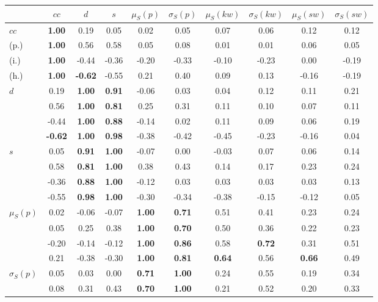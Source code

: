 \begin{table*}[h!]
\begin{center}
\begin{tabular}{| l || c | c | c | c | c | c | c | c | c |}\hline
 & $cc$ & $d$ & $s$ & $\mu_S(p)$ & $\sigma_S(p)$ & $\mu_S(kw)$ & $\sigma_S(kw)$ & $\mu_S(sw)$ & $\sigma_S(sw)$ \\\hline\hline
$cc$ & {\bf 1.00} & 0.19 & 0.05 & 0.02 & 0.05 & 0.07 & 0.06 & 0.12 & 0.12 \\
(p.) & {\bf 1.00} & 0.56 & 0.58 & 0.05 & 0.08 & 0.01 & 0.01 & 0.06 & 0.05 \\
(i.) & {\bf 1.00} & -0.44 & -0.36 & -0.20 & -0.33 & -0.10 & -0.23 & 0.00 & -0.19 \\
(h.) & {\bf 1.00} & {\bf -0.62} & -0.55 & 0.21 & 0.40 & 0.09 & 0.13 & -0.16 & -0.19 \\\hline
$d$ & 0.19 & {\bf 1.00} & {\bf 0.91} & -0.06 & 0.03 & 0.04 & 0.12 & 0.11 & 0.21 \\
 & 0.56 & {\bf 1.00} & {\bf 0.81} & 0.25 & 0.31 & 0.11 & 0.10 & 0.07 & 0.11 \\
 & -0.44 & {\bf 1.00} & {\bf 0.88} & -0.14 & 0.02 & 0.11 & 0.09 & 0.06 & 0.19 \\
 & {\bf -0.62} & {\bf 1.00} & {\bf 0.98} & -0.38 & -0.42 & -0.45 & -0.23 & -0.16 & 0.04 \\\hline
$s$ & 0.05 & {\bf 0.91} & {\bf 1.00} & -0.07 & 0.00 & -0.03 & 0.07 & 0.06 & 0.14 \\
 & 0.58 & {\bf 0.81} & {\bf 1.00} & 0.38 & 0.43 & 0.14 & 0.17 & 0.23 & 0.24 \\
 & -0.36 & {\bf 0.88} & {\bf 1.00} & -0.12 & 0.03 & 0.03 & 0.03 & 0.03 & 0.13 \\
 & -0.55 & {\bf 0.98} & {\bf 1.00} & -0.30 & -0.34 & -0.38 & -0.15 & -0.12 & 0.05 \\\hline
$\mu_S(p)$ & 0.02 & -0.06 & -0.07 & {\bf 1.00} & {\bf 0.71} & 0.51 & 0.41 & 0.23 & 0.24 \\
 & 0.05 & 0.25 & 0.38 & {\bf 1.00} & {\bf 0.70} & 0.50 & 0.36 & 0.22 & 0.23 \\
 & -0.20 & -0.14 & -0.12 & {\bf 1.00} & {\bf 0.86} & 0.58 & {\bf 0.72} & 0.31 & 0.51 \\
 & 0.21 & -0.38 & -0.30 & {\bf 1.00} & {\bf 0.81} & {\bf 0.64} & 0.56 & {\bf 0.66} & 0.49 \\\hline
$\sigma_S(p)$ & 0.05 & 0.03 & 0.00 & {\bf 0.71} & {\bf 1.00} & 0.24 & 0.55 & 0.19 & 0.34 \\
 & 0.08 & 0.31 & 0.43 & {\bf 0.70} & {\bf 1.00} & 0.21 & 0.52 & 0.20 & 0.33 \\

\end{tabular}
\end{center}
\end{table*}
